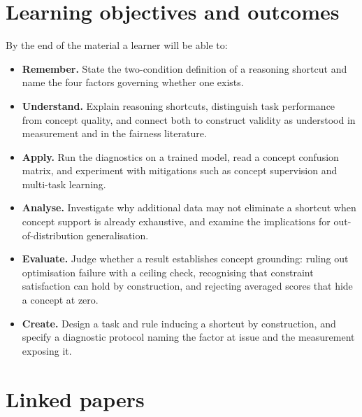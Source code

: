 \documentclass{article}
\begin{document}
\section{Learning objectives and outcomes}

By the end of the material a learner will be able to:

\begin{itemize}
  \item \textbf{Remember.} State the two-condition definition of a reasoning
    shortcut and name the four factors governing whether one exists.
  \item \textbf{Understand.} Explain reasoning shortcuts, distinguish task
    performance from concept quality, and connect both to construct validity as
    understood in measurement and in the fairness literature.
  \item \textbf{Apply.} Run the diagnostics on a trained model, read a concept
    confusion matrix, and experiment with mitigations such as concept
    supervision and multi-task learning.
  \item \textbf{Analyse.} Investigate why additional data may not eliminate a
    shortcut when concept support is already exhaustive, and examine the
    implications for out-of-distribution generalisation.
  \item \textbf{Evaluate.} Judge whether a result establishes concept grounding:
    ruling out optimisation failure with a ceiling check, recognising that
    constraint satisfaction can hold by construction, and rejecting averaged
    scores that hide a concept at zero.
  \item \textbf{Create.} Design a task and rule inducing a shortcut by
    construction, and specify a diagnostic protocol naming the factor at issue
    and the measurement exposing it.
\end{itemize}

\section{Linked papers}
\end{document}
